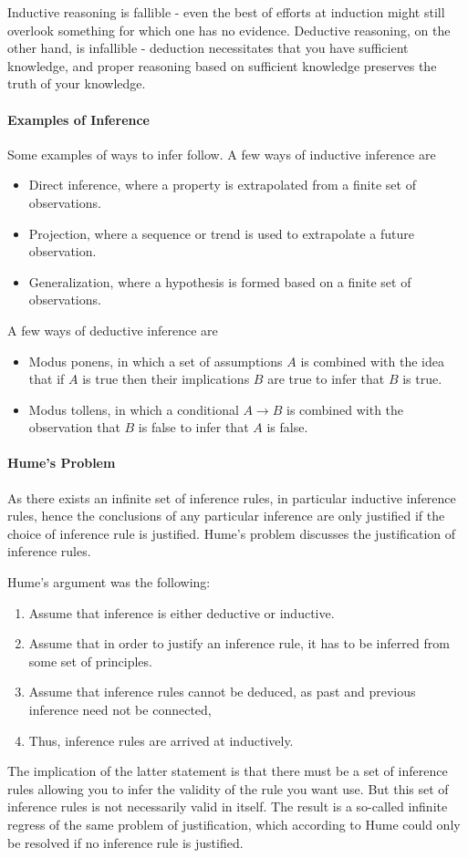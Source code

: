 Inductive reasoning is fallible - even the best of efforts at induction might still overlook something for which one has no evidence. Deductive reasoning, on the other hand, is infallible - deduction necessitates that you have sufficient knowledge, and proper reasoning based on sufficient knowledge preserves the truth of your knowledge.

\paragraph{Examples of Inference}
Some examples of ways to infer follow. A few ways of inductive inference are
\begin{itemize}
	\item Direct inference, where a property is extrapolated from a finite set of observations.
	\item Projection, where a sequence or trend is used to extrapolate a future observation.
	\item Generalization, where a hypothesis is formed based on a finite set of observations.
\end{itemize}

A few ways of deductive inference are
\begin{itemize}
	\item Modus ponens, in which a set of assumptions $A$ is combined with the idea that if $A$ is true then their implications $B$ are true to infer that $B$ is true.
	\item Modus tollens, in which a conditional $A\to B$ is combined with the observation that $B$ is false to infer that $A$ is false. 
\end{itemize}

\paragraph{Hume's Problem}
As there exists an infinite set of inference rules, in particular inductive inference rules, hence the conclusions of any particular inference are only justified if the choice of inference rule is justified. Hume's problem discusses the justification of inference rules.

Hume's argument was the following:
\begin{enumerate}
	\item Assume that inference is either deductive or inductive.
	\item Assume that in order to justify an inference rule, it has to be inferred from some set of principles.
	\item Assume that inference rules cannot be deduced, as past and previous inference need not be connected,
	\item Thus, inference rules are arrived at inductively.
\end{enumerate}
The implication of the latter statement is that there must be a set of inference rules allowing you to infer the validity of the rule you want use. But this set of inference rules is not necessarily valid in itself. The result is a so-called infinite regress of the same problem of justification, which according to Hume could only be resolved if no inference rule is justified.

